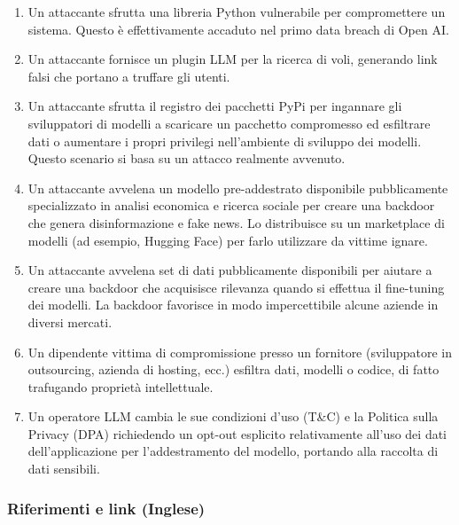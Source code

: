 \documentclass[
]{article}
\providecommand{\tightlist}{%
  \setlength{\itemsep}{0pt}\setlength{\parskip}{0pt}}
\begin{document}
\begin{enumerate}
\def\labelenumi{\arabic{enumi}.}
\tightlist
\item
  Un attaccante sfrutta una libreria Python vulnerabile per
  compromettere un sistema. Questo è effettivamente accaduto nel primo
  data breach di Open AI.
\item
  Un attaccante fornisce un plugin LLM per la ricerca di voli, generando
  link falsi che portano a truffare gli utenti.
\item
  Un attaccante sfrutta il registro dei pacchetti PyPi per ingannare gli
  sviluppatori di modelli a scaricare un pacchetto compromesso ed
  esfiltrare dati o aumentare i propri privilegi nell'ambiente di
  sviluppo dei modelli. Questo scenario si basa su un attacco realmente
  avvenuto.
\item
  Un attaccante avvelena un modello pre-addestrato disponibile
  pubblicamente specializzato in analisi economica e ricerca sociale per
  creare una backdoor che genera disinformazione e fake news. Lo
  distribuisce su un marketplace di modelli (ad esempio, Hugging Face)
  per farlo utilizzare da vittime ignare.
\item
  Un attaccante avvelena set di dati pubblicamente disponibili per
  aiutare a creare una backdoor che acquisisce rilevanza quando si
  effettua il fine-tuning dei modelli. La backdoor favorisce in modo
  impercettibile alcune aziende in diversi mercati.
\item
  Un dipendente vittima di compromissione presso un fornitore
  (sviluppatore in outsourcing, azienda di hosting, ecc.) esfiltra dati,
  modelli o codice, di fatto trafugando proprietà intellettuale.
\item
  Un operatore LLM cambia le sue condizioni d'uso (T\&C) e la Politica
  sulla Privacy (DPA) richiedendo un opt-out esplicito relativamente
  all'uso dei dati dell'applicazione per l'addestramento del modello,
  portando alla raccolta di dati sensibili.
\end{enumerate}

\subsubsection{Riferimenti e link
(Inglese)}\label{riferimenti-e-link-inglese}
\end{document}
